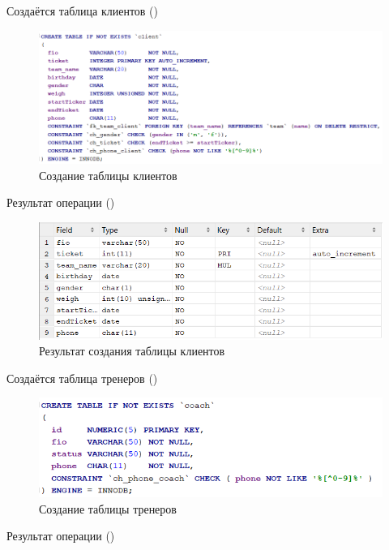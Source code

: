 \documentclass[a4paper,14pt]{article}
\begin{document}
	Создаётся таблица клиентов ()
	
	\begin{figure}[H]
		\centering		
		\includegraphics[width=1\linewidth]{image/createClient.png}
		\caption{Создание таблицы клиентов}\label{img:createClient}
	\end{figure}
	
	Результат операции ()
	
	\begin{figure}[H]
		\centering		
		\includegraphics[width=\linewidth]{image/resClient}
		\caption{Результат создания таблицы клиентов}\label{img:resClient}
	\end{figure} 

	Создаётся таблица тренеров ()
	
	\begin{figure}[H]
		\centering		
		\includegraphics[width=1\linewidth]{image/createCoach.png}
		\caption{Создание таблицы тренеров}\label{img:createCoach}
	\end{figure}
	
	Результат операции ()
	
\end{document}
